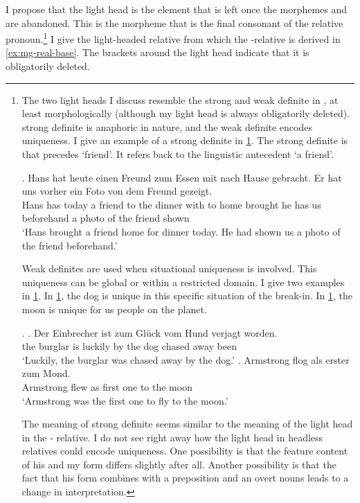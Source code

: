 I propose that the light head is the element that is left once the morphemes  and  are abandoned. This is the morpheme that is the final consonant of the relative pronoun.\footnote{
The two light heads I discuss resemble the strong and weak definite in \citet{schwarz2009}, at least morphologically (although my light head is always obligatorily deleted).  strong definite is anaphoric in nature, and the weak definite encodes uniqueness. I give an example of a strong definite in \ref{ex:mg-florian-strong}. The strong definite is  that precedes  `friend'. It refers back to the linguistic antecedent  `a friend'.

\exg. Hans hat heute einen Freund zum Essen mit nach Hause gebracht. Er hat uns vorher ein Foto von dem Freund gezeigt.\\
Hans has today a friend {to the} dinner with to home brought he has us beforehand a photo of the friend shown\\
`Hans brought a friend home for dinner today. He had shown us a photo of the friend beforehand.'\label{ex:mg-florian-strong}

Weak definites are used when situational uniqueness is involved. This uniqueness can be global or within a restricted domain. I give two examples in \ref{ex:mg-florian-weak}. In \ref{ex:mg-florian-weak-hund}, the dog is unique in this specific situation of the break-in. In \ref{ex:mg-florian-weak-mond}, the moon is unique for us people on the planet.

\ex.\label{ex:mg-florian-weak}
\ag. Der Einbrecher ist {zum Glück} vom Hund verjagt worden.\\
the burglar is luckily {by the} dog {chased away} been\\
`Luckily, the burglar was chased away by the dog.'\label{ex:mg-florian-weak-hund}
\bg. Armstrong flog als erster zum Mond.\\
Armstrong flew as {first one} {to the} moon\\
`Armstrong was the first one to fly to the moon.' \label{ex:mg-florian-weak-mond}

The meaning of  strong definite seems similar to the meaning of the light head in the - relative.
I do not see right away how the light head in headless relatives could encode uniqueness. One possibility is that the feature content of his and my form differs slightly after all. Another possibility is that the fact that his form combines with a preposition and an overt nouns leads to a change in interpretation.
}
I give the light-headed relative from which the -relative is derived in \ref{ex:mg-real-base}. The brackets around the light head indicate that it is obligatorily deleted.

